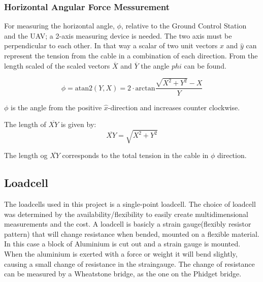    

\subsubsection{Horizontal Angular Force Messurement}

For measuring the horizontal angle, $\phi$, relative to the Ground Control Station and the UAV; a 2-axis measuring device is needed. The two axis must be perpendicular to each other. In that way a scalar of two unit vectors $\hat{x}$ and $\hat{y}$ can represent the tension from the cable in a combination of each direction. 
From the length scaled of the scaled vectors $\overline{X}$ and $\overline{Y}$ the angle $phi$ can be found.

\begin{equation}
\phi = \mathrm{atan2} (Y,  X) = 2 \cdot \mathrm{arctan} \frac{\sqrt{X^2+Y^2}-X}{Y}
\end{equation}

\noindent
$\phi$ is the angle from the positive $\hat{x}$-direction and increases counter clockwise. 

\noindent
The length of $\overline{XY}$ is given by:
\begin{equation}
\overline{XY} = \sqrt{X^2+Y^2}
\end{equation}

\noindent
The length og $\overline{XY}$ corresponds to the total tension in the cable in $\phi$ direction. 

\subsection{Loadcell}
The loadcells used in this project is a single-point loadcell. The choice of loadcell was determined by the availability/flexibility to easily create multidimensional measurements and the cost. A loadcell is basicly a strain gauge(flexibly resistor pattern) that will change resistance when bended, mounted on a flexible material. In this case a block of Aluminium is cut out and a strain gauge is mounted. When the aluminium is exerted with a force or weight it will bend slightly, causing a small change of resistance in the straingauge. The change of resistance can be measured by a Wheatstone bridge, as the one on the Phidget bridge. 

